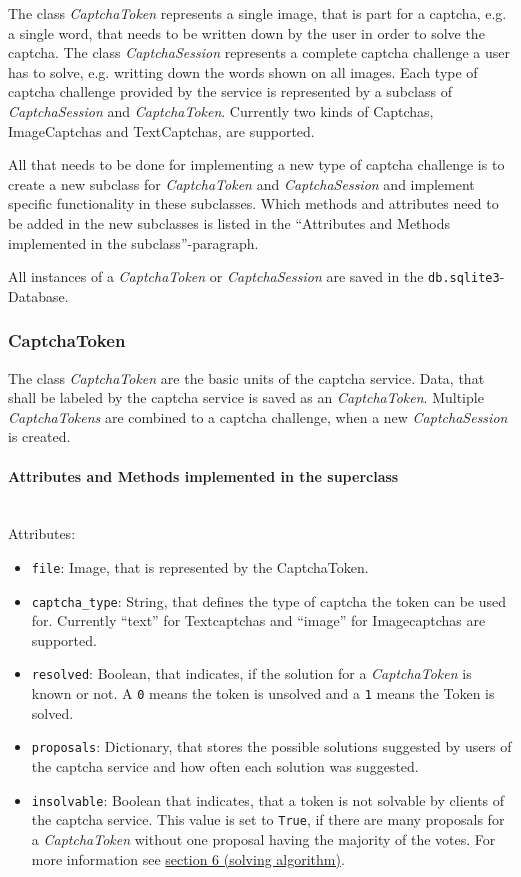 The class \emph{CaptchaToken} represents a single image, that is part for a captcha, e.g. a single word, that needs to be written down by the user in order to solve the captcha. The class \emph{CaptchaSession} represents a complete captcha challenge a user has to solve, e.g. writting down the words shown on all images. Each type of captcha challenge provided by the service is represented by a subclass of \emph{CaptchaSession} and \emph{CaptchaToken}. Currently two kinds of Captchas, ImageCaptchas and TextCaptchas, are supported. 


All that needs to be done for implementing a new type of captcha challenge is to create a new subclass for \emph{CaptchaToken} and \emph{CaptchaSession} and implement specific functionality in these subclasses. Which methods and attributes need to be added in the new subclasses is listed in the ``Attributes and Methods implemented in the subclass''-paragraph.

All instances of a \emph{CaptchaToken} or \emph{CaptchaSession} are saved in the \verb|db.sqlite3|-Database. 

\subsubsection{CaptchaToken}

The class \emph{CaptchaToken} are the basic units of the captcha service. Data, that shall be labeled by the captcha service is saved as an \emph{CaptchaToken}. Multiple \emph{CaptchaTokens} are combined to a captcha challenge, when a new \emph{CaptchaSession} is created.

\paragraph{Attributes and Methods implemented in the superclass} \mbox{} \\

Attributes:

\begin{itemize}
\item \verb|file|: Image, that is represented by the CaptchaToken.
\item \verb|captcha_type|: String, that defines the type of captcha the token can be used for. Currently ``text'' for Textcaptchas and ``image'' for Imagecaptchas are supported.
\item \verb|resolved|: Boolean, that indicates, if the solution for a \emph{CaptchaToken} is known or not. A \verb|0| means the token is unsolved and a \verb|1| means the Token is solved.
\item \verb|proposals|: Dictionary, that stores the possible solutions suggested by users of the captcha service and how often each solution was suggested.
\item \verb|insolvable|: Boolean that indicates, that a token is not solvable by clients of the captcha service. This value is set to \verb|True|, if there are many proposals for a \emph{CaptchaToken} without one proposal having the majority of the votes. For more information see \hyperref[sec:solving_algorithm]{section 6 (solving algorithm)}.
\end{itemize}

